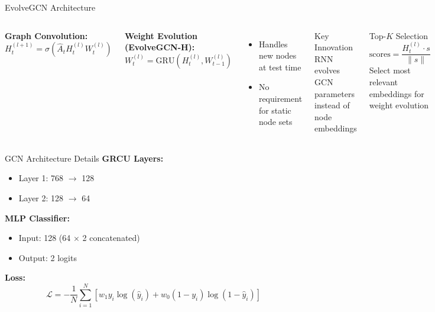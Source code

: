 \documentclass[aspectratio=169,xcolor=dvipsnames]{beamer}
\begin{document}
\begin{frame}{EvolveGCN Architecture }
	\begin{columns}[c]
		\textbf{Graph Convolution:}
		\[
			H_t^{(l+1)} = \sigma(\hat{A}_t H_t^{(l)} W_t^{(l)})
		\]

		\textbf{Weight Evolution (EvolveGCN-H):}
		\[
			W_t^{(l)} = \text{GRU}(H_t^{(l)}, W_{t-1}^{(l)})
		\]
		\begin{itemize}
			\item Handles new nodes at test time
			\item No requirement for static node sets
		\end{itemize}


		\begin{block}{Key Innovation}
			RNN evolves GCN parameters instead of node embeddings
		\end{block}
		\begin{alertblock}{Top-$K$ Selection}
			\[
				\text{scores} = \frac{H_t^{(l)} \cdot s}{\|s\|}
			\]
			Select most relevant embeddings for weight evolution
		\end{alertblock}
	\end{columns}
\end{frame}

\begin{frame}{GCN Architecture Details }
	\textbf{GRCU Layers:}
	\begin{itemize}
		\item Layer 1: 768 $\rightarrow$ 128
		\item Layer 2: 128 $\rightarrow$ 64
	\end{itemize}

	\vspace{0.5em}

	\textbf{MLP Classifier:}
	\begin{itemize}
		\item Input: 128 (64 $\times$ 2 concatenated)
		\item Output: 2 logits
	\end{itemize}

	\vspace{0.5em}

	\textbf{Loss:}
	\begin{equation*}
		\mathcal{L} = -\frac{1}{N} \sum_{i=1}^N \left[ w_1 y_i \log(\hat{y}_i) + w_0 (1 - y_i) \log(1 - \hat{y}_i) \right]
	\end{equation*}


\end{frame}
\end{document}

